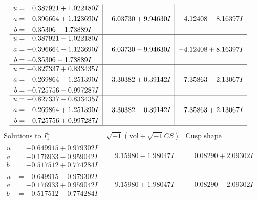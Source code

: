 \documentclass[1p]{elsarticle_modified}
\theoremstyle{definition}
\newcommand{\I}{\sqrt{-1}}
\begin{document}
$$\begin{array}{c|c|c}
\begin{aligned}
u &= \phantom{-}0.387921 + 1.022180 I \\
a &= -0.396664 + 1.123690 I \\
b &= -0.35306 - 1.73889 I\end{aligned}
 & \phantom{-}6.03730 + 9.94630 I & -4.12408 - 8.16397 I \\ \hline\begin{aligned}
u &= \phantom{-}0.387921 - 1.022180 I \\
a &= -0.396664 - 1.123690 I \\
b &= -0.35306 + 1.73889 I\end{aligned}
 & \phantom{-}6.03730 - 9.94630 I & -4.12408 + 8.16397 I \\ \hline\begin{aligned}
u &= -0.827337 + 0.833435 I \\
a &= \phantom{-}0.269864 - 1.251390 I \\
b &= -0.725756 - 0.997287 I\end{aligned}
 & \phantom{-}3.30382 + 0.39142 I & -7.35863 - 2.13067 I \\ \hline\begin{aligned}
u &= -0.827337 - 0.833435 I \\
a &= \phantom{-}0.269864 + 1.251390 I \\
b &= -0.725756 + 0.997287 I\end{aligned}
 & \phantom{-}3.30382 - 0.39142 I & -7.35863 + 2.13067 I\\
 \hline 
 \end{array}$$\newpage$$\begin{array}{c|c|c}  
\text{Solutions to }I^u_{1}& \I (\text{vol} + \sqrt{-1}CS) & \text{Cusp shape}\\
 \hline 
\begin{aligned}
u &= -0.649915 + 0.979302 I \\
a &= -0.176933 - 0.959042 I \\
b &= -0.517512 + 0.774284 I\end{aligned}
 & \phantom{-}9.15980 - 1.98047 I & \phantom{-}0.08290 + 2.09302 I \\ \hline\begin{aligned}
u &= -0.649915 - 0.979302 I \\
a &= -0.176933 + 0.959042 I \\
b &= -0.517512 - 0.774284 I\end{aligned}
 & \phantom{-}9.15980 + 1.98047 I & \phantom{-}0.08290 - 2.09302 I \\ \hline\begin{aligned}

\end{aligned}
\end{array}$$
\end{document}
